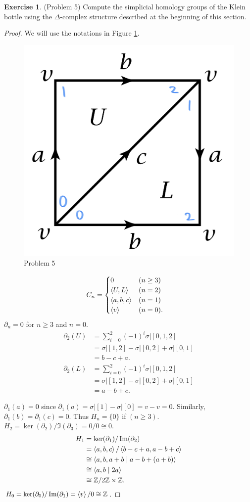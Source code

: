 \documentclass[12pt, psamsfonts]{amsart}
\theoremstyle{definition}
\newtheorem*{exer}{Exercise}
\theoremstyle{remark}
\numberwithin{equation}{section}
\begin{document}
\begin{exer}{(Problem 5)}
  Compute the simplicial homology groups of the Klein bottle using the $\Delta$-complex structure described at the beginning of this section.
\end{exer}

\begin{proof}
  We will use the notations in Figure \ref{fig:problem5_klein}.
  \begin{figure}
    \includegraphics[width=.3\linewidth]{problem5_klein.jpeg}
    \caption{Problem 5}
    \label{fig:problem5_klein}
  \end{figure}

  \begin{align*}
    C_n &= \begin{cases}
      0 & (n \geq 3) \\
      \ev{ U, L } & (n = 2) \\
      \ev{ a, b, c} & (n = 1) \\
      \ev{ v } & (n = 0).
    \end{cases}
  \end{align*}
  $\partial_n = 0$ for $n \geq 3$ and $n = 0$.
  \begin{align*}
    \partial_2(U)
      &= \sum_{i = 0}^2 (-1)^i \sigma \vert [0, 1, 2] \\
      &= \sigma \vert [1, 2] - \sigma \vert [0, 2] + \sigma \vert [0, 1] \\
      &= b - c + a. \\
    \partial_2(L)
      &= \sum_{i = 0}^2 (-1)^i \sigma \vert [0, 1, 2] \\
      &= \sigma \vert [1, 2] - \sigma \vert [0, 2] + \sigma \vert [0, 1] \\
      &= a - b + c.
  \end{align*}

  $\partial_1(a) = 0$ since $\partial_1(a) = \sigma \vert [1] - \sigma \vert [0] = v - v = 0$.
  Similarly, $\partial_1(b) = \partial_1(c) = 0$.
  Thus $H_n = \{ 0 \}$ if $(n \geq 3)$.
  $H_2 = \ker(\partial_2) / \Im(\partial_3) = 0 / 0 \cong 0$.
  \begin{align*}
    H_1 &= \ker(\partial_1) / \Im(\partial_2) \\
        &= \ev{ a, b, c } / \ev{ b - c + a, a - b + c} \\
        &\cong \ev{ a, b, a + b \mid a - b + (a + b) } \\
        &\cong \ev{ a, b \mid 2a } \\
        &\cong \mathbb{Z}/2\mathbb{Z} \times \mathbb{Z}.
  \end{align*}
  $H_0 = \ker(\partial_0) / \Im(\partial_1) = \ev{ v } / 0 \cong \mathbb{Z}$.
\end{proof}
\end{document}

